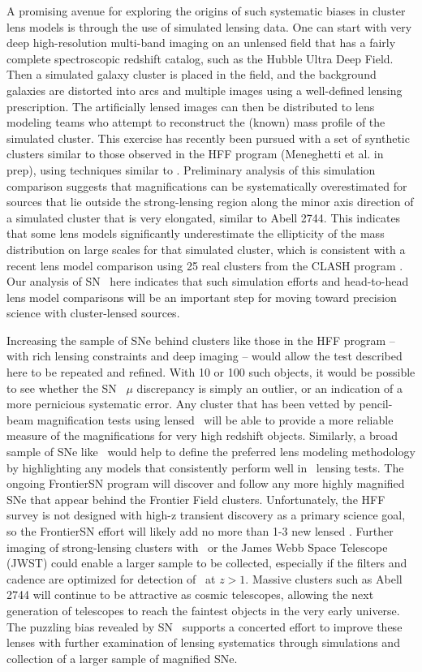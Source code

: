A promising avenue for exploring the origins of such systematic biases in
cluster lens models is through the use of simulated lensing data.  One
can start with very deep high-resolution multi-band imaging on an
unlensed field that has a fairly complete spectroscopic redshift
catalog, such as the Hubble Ultra Deep Field.  Then a simulated galaxy
cluster is placed in the field, and the background galaxies are
distorted into arcs and multiple images using a well-defined lensing
prescription.  The artificially lensed images can then be distributed
to lens modeling teams who attempt to reconstruct the (known) mass
profile of the simulated cluster.  This exercise has recently been
pursued with a set of synthetic clusters similar to those observed in
the HFF program (Meneghetti et al. in prep), using techniques
similar to \citet{Meneghetti:2010,Meneghetti:2014}.  Preliminary
analysis of this simulation comparison suggests that
magnifications can be systematically overestimated for
sources that lie outside the strong-lensing region along the minor
axis direction of a simulated cluster that is very
elongated, similar to Abell 2744.  This indicates that some
lens models significantly underestimate the ellipticity of the mass
distribution on large scales for that simulated cluster, which is
consistent with a recent lens model comparison using 25 real clusters
from the CLASH program \citep{Zitrin:2015}. Our analysis of
SN \tomas\ here indicates that such simulation efforts and
head-to-head lens model comparisons will be an important step for
moving toward precision science with cluster-lensed sources.  

Increasing the sample of SNe behind clusters like those in the HFF
program -- with rich lensing constraints and deep imaging -- would
allow the test described here to be repeated and refined.  With 10 or
100 such objects, it would be possible to see whether the SN \tomas\
$\mu$ discrepancy is simply an outlier, or an indication of a more
pernicious systematic error.  Any cluster that has been vetted by
pencil-beam magnification tests using lensed \SNIa\ will be able to
provide a more reliable measure of the magnifications for very high
redshift objects.  Similarly, a broad sample of SNe like \tomas\ would
help to define the preferred lens modeling methodology by highlighting
any models that consistently perform well in \SNIa\ lensing tests.
The ongoing FrontierSN program will discover and follow any more
highly magnified SNe that appear behind the Frontier Field
clusters. Unfortunately, the HFF survey is not designed with high-z
transient discovery as a primary science goal, so the FrontierSN
effort will likely add no more than 1-3 new lensed \SNIa. Further
imaging of strong-lensing clusters with \HST\ or the James Webb Space
Telescope (JWST) could enable a larger sample to be collected,
especially if the filters and cadence are optimized for detection
of \SNIa\ at $z>1$.  Massive clusters such as Abell 2744 will continue
to be attractive as cosmic telescopes, allowing the next generation of
telescopes to reach the faintest objects in the very early universe.
The puzzling bias revealed by SN \tomas\ supports a concerted effort
to improve these lenses with further examination of lensing
systematics through simulations and collection of a larger sample of
magnified SNe.


